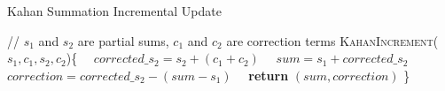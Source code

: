 \begin{algorithm}
\caption{Kahan Summation Incremental Update} 
\label{algo:kahan}
\begin{algorithmic}
\small{
\STATE //  $s_1$ and $s_2$ are partial sums, $c_1$ and $c_2$ are correction terms
\STATE \textsc{KahanIncrement}($s_1, c_1, s_2, c_2$)\{
\STATE \ \ $corrected\_s_2 = s_2 + (c_1+c_2)$
\STATE \ \ $sum=s_1+corrected\_s_2$
\STATE \ \ $correction=corrected\_s_2-(sum - s_1)$
\STATE \ \ \textbf{return} $(sum, correction)$ \}
}
\end{algorithmic}
\end{algorithm}

